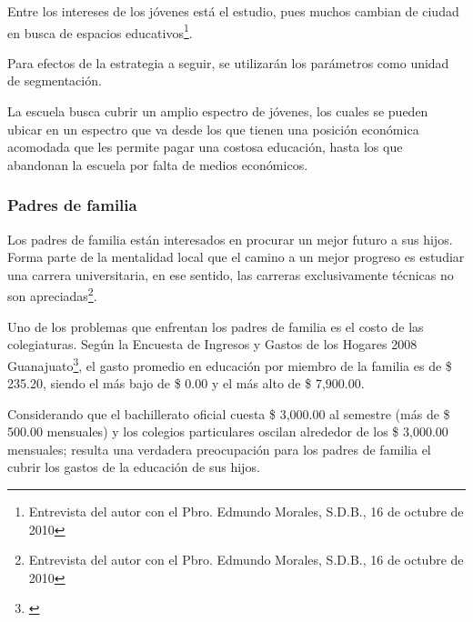 Entre los intereses de los jóvenes está el estudio, pues muchos cambian de ciudad en busca de espacios educativos\footnote{Entrevista del autor con el Pbro. Edmundo Morales, S.D.B., 16 de octubre de 2010}.

Para efectos de la estrategia a seguir, se utilizarán los parámetros como unidad de segmentación.

La escuela busca cubrir un amplio espectro de jóvenes, los cuales se pueden ubicar en un espectro que va desde los que tienen una posición económica acomodada que les permite pagar una costosa educación, hasta los que abandonan la escuela por falta de medios económicos.


\subsubsection{Padres de familia}

Los padres de familia están interesados en procurar un mejor futuro a sus hijos. Forma parte de la mentalidad local que el camino a un mejor progreso es estudiar una carrera universitaria, en ese sentido, las carreras exclusivamente técnicas no son apreciadas\footnote{Entrevista del autor con el Pbro. Edmundo Morales, S.D.B., 16 de octubre de 2010}.

Uno de los problemas que enfrentan los padres de familia es el costo de las colegiaturas. Según la Encuesta de Ingresos y Gastos de los Hogares 2008 Guanajuato\footnote{\citep{INEGI-2009-DGES-003}}, el gasto promedio en educaci\'on por miembro de la familia es de \$ 235.20, siendo el m\'as bajo de \$ 0.00 y el m\'as alto de \$ 7,900.00.

Considerando que el bachillerato oficial cuesta \$ 3,000.00 al semestre (m\'as de \$ 500.00 mensuales) y los colegios particulares oscilan alrededor de los \$ 3,000.00 mensuales; resulta una verdadera preocupaci\'on para los padres de familia el cubrir los gastos de la educaci\'on de sus hijos.

